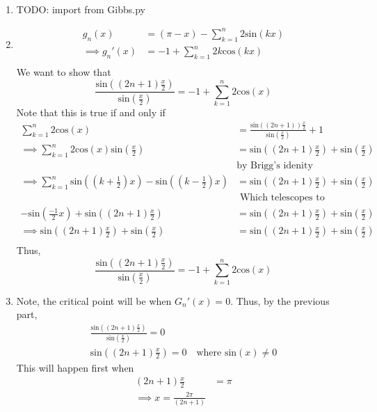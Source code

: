 \documentclass[letterpaper,12pt]{article}
\theoremstyle{definition}
\begin{document}
\\
\begin{enumerate}
    \item 
        TODO: import from Gibbs.py
    \item
\begin{align*}
    g_n(x) &= (\pi - x) - \sum^{n}_{k=1} 2 \text{sin}(kx) \\
    \implies g_n'(x) &= -1 + \sum^{n}_{k=1} 2 k \text{cos}(kx) \\
\end{align*}
We want to show that 
    \[\frac{\text{sin} \left( (2n+1)\frac{x}{2} \right)}{\text{sin} (\frac{x}{2}) }  =-1 + \sum^{n}_{k=1} 2 \text{cos}(x)\] Note that this is true if and only if 
\begin{align*}
     \sum^{n}_{k=1} 2 \text{cos}(x) & = \frac{\text{sin} \left( (2n+1) \right)\frac{x}{2} }{\text{sin} (\frac{x}{2}) } +1 \\
     \implies \sum^{n}_{k=1} 2 \text{cos}(x) \text{sin}(\frac{x}{2}) & = \text{sin}( (2n+1) \frac{x}{2}) + \text{sin}(\frac{x}{2}) \\
     &\text{by Brigg's idenity} \\
     \implies \sum^n_{k=1} \text{sin}( (k+\frac{1}{2})x) - \text{sin}( (k-\frac{1}{2})x) & =\text{sin}( (2n+1) \frac{x}{2}) + \text{sin}(\frac{x}{2}) \\
     &\text{ Which telescopes to} \\
     - \text{sin}(\frac{-1}{2}x)+ \text{sin}( (2n+1) \frac{x}{2}) & = \text{sin}( (2n+1) \frac{x}{2}) + \text{sin}(\frac{x}{2}) \\
     \implies \text{sin}( (2n+1) \frac{x}{2}) + \text{sin}(\frac{x}{2}) & = \text{sin}( (2n+1) \frac{x}{2}) + \text{sin}(\frac{x}{2}) \\
\end{align*}
Thus, 
    \[\frac{\text{sin} \left( (2n+1)\frac{x}{2} \right) }{\text{sin} (\frac{x}{2}) }  =-1 + \sum^{n}_{k=1} 2 \text{cos}(x)\]
    \item Note, the critical point will be when $G_n'(x) = 0$. Thus, by the previous part,
        \begin{align*}
            \frac{\text{sin} \left( (2n+1)\frac{x}{2} \right) }{\text{sin} (\frac{x}{2}) } = 0\\
            \text{sin} \left( (2n+1)\frac{x}{2} \right) = 0 \quad \text{where sin$(x)\neq 0$}
        \end{align*}
        This will happen first when 
        \begin{align*}
        (2n+1) \frac{x}{2} & = \pi\\
        \implies x = \frac{2\pi}{(2n+1)}
        \end{align*}
\end{enumerate}
\end{document}
